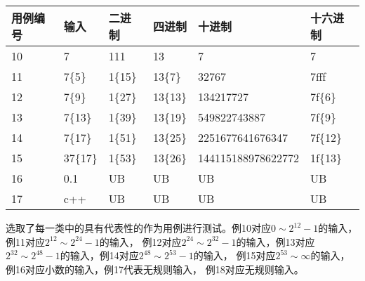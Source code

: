 \documentclass[12pt, a4paper, oneside]{ctexart}
\begin{document}
\newpage
\begin{table}[!h]
    \begin{tabular}{|l|l|l|l|l|l|}
    \hline
    用例编号 & 输入 & 二进制 & 四进制  & 十进制 & 十六进制 \\ \hline
    10 & 7 & 111 & 13 & 7 &  7 \\ \hline
    11 & 7\{5\} & 1\{15\} & 13\{7\} & 32767 & 7fff \\ \hline
    12 & 7\{9\} &  1\{27\} & 13\{13\} & 134217727 & 7f\{6\} \\ \hline
    13 & 7\{13\} & 1\{39\} &  13\{19\} & 549822743887 & 7f\{9\} \\ \hline
    14 & 7\{17\} & 1\{51\}&  13\{25\} & 2251677641676347 & 7f\{12\} \\ \hline
    15 & 37\{17\}& 1\{53\} &  13\{26\}& 144115188978622772 & 1f\{13\} \\ \hline
    16 & 0.1 & UB &UB &UB  &UB \\ \hline
    17 & c++ &UB &UB &UB &UB \\ \hline
    \end{tabular}
\end{table}
选取了每一类中的具有代表性的作为用例进行测试。例10对应$0\sim2^{12}-1$的输入，例11对应$2^{12}\sim2^{24}-1$的输入，
例12对应$2^{24}\sim2^{32}-1$的输入，例13对应$2^{32}\sim2^{48}-1$的输入，例14对应$2^{48}\sim2^{53}-1$的输入，
例15对应$2^{53}\sim∞$的输入，例16对应小数的输入，例17代表无规则输入，
例18对应无规则输入。
\end{document}
